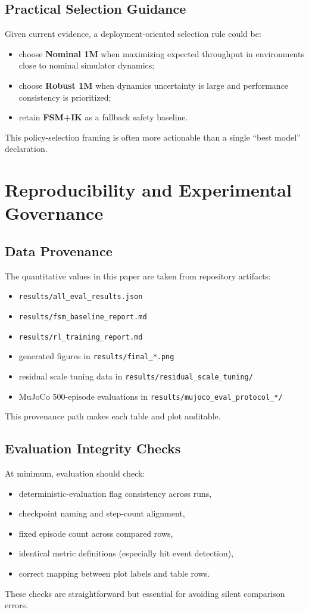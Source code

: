 \documentclass[10pt,twocolumn,letterpaper]{article}
\begin{document}
\subsection{Practical Selection Guidance}
Given current evidence, a deployment-oriented selection rule could be:
\begin{itemize}[leftmargin=*,noitemsep]
    \item choose \textbf{Nominal 1M} when maximizing expected throughput in environments close to nominal simulator dynamics;
    \item choose \textbf{Robust 1M} when dynamics uncertainty is large and performance consistency is prioritized;
    \item retain \textbf{FSM+IK} as a fallback safety baseline.
\end{itemize}
This policy-selection framing is often more actionable than a single ``best model'' declaration.

\section{Reproducibility and Experimental Governance}
\subsection{Data Provenance}
The quantitative values in this paper are taken from repository artifacts:
\begin{itemize}[leftmargin=*,noitemsep]
    \item \texttt{results/all\_eval\_results.json}
    \item \texttt{results/fsm\_baseline\_report.md}
    \item \texttt{results/rl\_training\_report.md}
    \item generated figures in \texttt{results/final\_*.png}
    \item residual scale tuning data in \texttt{results/residual\_scale\_tuning/}
    \item MuJoCo 500-episode evaluations in \texttt{results/mujoco\_eval\_protocol\_*/}
\end{itemize}
This provenance path makes each table and plot auditable.

\subsection{Evaluation Integrity Checks}
At minimum, evaluation should check:
\begin{itemize}[leftmargin=*,noitemsep]
    \item deterministic-evaluation flag consistency across runs,
    \item checkpoint naming and step-count alignment,
    \item fixed episode count across compared rows,
    \item identical metric definitions (especially hit event detection),
    \item correct mapping between plot labels and table rows.
\end{itemize}
These checks are straightforward but essential for avoiding silent comparison errors.
\end{document}
